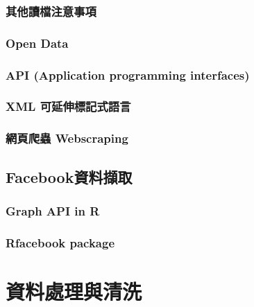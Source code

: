 \documentclass[]{book}
\begin{document}
\hypertarget{ux5176ux4ed6ux8b80ux6a94ux6ce8ux610fux4e8bux9805}{%
\subsection{其他讀檔注意事項}\label{ux5176ux4ed6ux8b80ux6a94ux6ce8ux610fux4e8bux9805}}

\hypertarget{open-data}{%
\subsection{Open Data}\label{open-data}}

\hypertarget{api}{%
\subsection{API (Application programming interfaces)}\label{api}}

\hypertarget{xml}{%
\subsection{XML 可延伸標記式語言}\label{xml}}

\hypertarget{ux7db2ux9801ux722cux87f2-webscraping}{%
\subsection{網頁爬蟲 Webscraping}\label{ux7db2ux9801ux722cux87f2-webscraping}}

\hypertarget{facebookux8cc7ux6599ux64f7ux53d6}{%
\section{Facebook資料擷取}\label{facebookux8cc7ux6599ux64f7ux53d6}}

\hypertarget{graph-api-in-r}{%
\subsection{Graph API in R}\label{graph-api-in-r}}

\hypertarget{rfacebook-package}{%
\subsection{Rfacebook package}\label{rfacebook-package}}

\hypertarget{manipulation}{%
\chapter{資料處理與清洗}\label{manipulation}}
\end{document}
